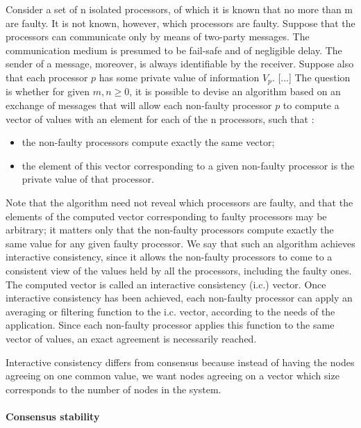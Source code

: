 \documentclass[11pt, twocolumn]{article}
\begin{document}
\begin{displayquote}
    Consider a set of n isolated processors, of which it is known that no more than m are faulty.
    It is not known, however, which processors are faulty. Suppose that the processors can communicate only by means of two-party messages.
    The communication medium is presumed to be fail-safe and of negligible delay. The sender of a message, moreover, is always identifiable by the receiver.
    Suppose also that each processor $p$ has some private value of information \(V_{p}\). [...]
    The question is whether for given \(m, n \geqslant 0 \), it is possible to devise an algorithm based on an exchange of messages that will allow each non-faulty processor $p$ to compute a vector of values with an element for each of the n processors, such that :

    \begin{itemize}
        \item the non-faulty processors compute exactly the same vector;
        \item the element of this vector corresponding to a given non-faulty processor is the private value of that processor.
    \end{itemize}

    Note that the algorithm need not reveal which processors are faulty, and that the elements of the computed vector corresponding to faulty processors may be arbitrary; it matters only that the non-faulty processors compute exactly the same value for any given faulty processor.
    We say that such an algorithm achieves interactive consistency, since it allows the non-faulty processors to come to a consistent view of the values held by all the processors, including the faulty ones. The computed vector is called an interactive consistency (i.c.) vector. Once interactive consistency has been achieved, each non-faulty processor can apply an averaging or filtering function to the i.c. vector, according to the needs of the application.
    Since each non-faulty processor applies this function to the same vector of values, an exact agreement is necessarily reached.

\end{displayquote}

Interactive consistency differs from consensus because instead of having the nodes agreeing on one common value, we want nodes agreeing on a vector which size corresponds to the number of nodes in the system.

\paragraph{Consensus stability}
\end{document}
